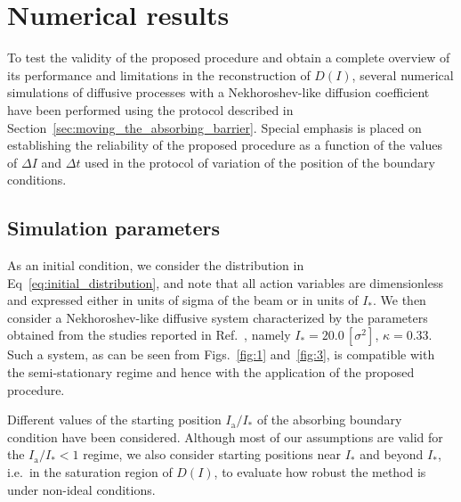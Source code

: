 
\section{Numerical results}
\label{sec:numerical_results}


To test the validity of the proposed procedure and obtain a complete overview of its performance and limitations in the reconstruction of $D(I)$, several numerical simulations of diffusive processes with a Nekhoroshev-like diffusion coefficient have been performed using the protocol described in Section~\ref{sec:moving_the_absorbing_barrier}. Special emphasis is placed on establishing the reliability of the proposed procedure as a function of the values of $\Delta I$ and $\Delta t$ used in the protocol of variation of the position of the boundary conditions.


\subsection{Simulation parameters}


As an initial condition, we consider the distribution in Eq~\eqref{eq:initial_distribution}, and note that all action variables are {dimensionless and expressed either in units of sigma of the beam or in units of $I_\ast$}. We then consider a Nekhoroshev-like diffusive system characterized by the parameters obtained from the studies reported in Ref.~\cite{bazzani2020diffusion}, namely $I_\ast = 20.0\,[\sigma^2]$, $\kappa = 0.33$. Such a system, as can be seen from Figs.~\ref{fig:1} and~\ref{fig:3}, is compatible with the semi-stationary regime and hence with the application of the proposed procedure.

Different values of the starting position $I_\mathrm{a}/I_\ast$ of the absorbing boundary condition have been considered. Although most of our assumptions are valid for the $I_\mathrm{a}/I_\ast < 1$ regime, we also consider starting positions near $I_\ast$ and beyond $I_\ast$, i.e.\ in the saturation region of $D(I)$, to evaluate how robust the method is under non-ideal conditions.

